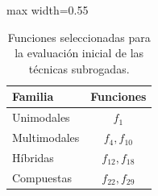 
\begin{table}[H]
    \centering
    \begin{adjustbox}{max width=0.55\textwidth}
        \begin{tabular}{lc}
            \toprule
            \textbf{Familia} & \textbf{Funciones} \\
            \midrule
            Unimodales       & \(f_1\)            \\
            Multimodales     & \(f_4, f_{10}\)    \\
            Híbridas         & \(f_{12}, f_{18}\) \\
            Compuestas       & \(f_{22}, f_{29}\) \\
            \bottomrule
        \end{tabular}
    \end{adjustbox}
    \caption{Funciones seleccionadas para la evaluación inicial de las técnicas subrogadas.}
    \label{tab:funciones_cribado_surrogate}
\end{table}